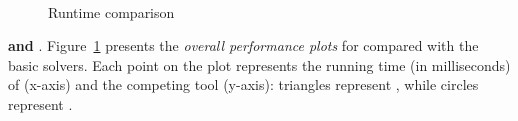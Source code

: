\begin{figure}
~
\caption{Runtime comparison}
\label{fig:toolplot}
\end{figure}

\textbf{\ringenSync{} and \theringenCICI{} }. Figure~\ref{fig:toolplot} presents the \textit{overall performance plots} for \theringenCICI{}compared with the basic solvers. Each point on the plot represents the running time (in milliseconds) of \theringenCICI{} (x-axis) and the competing tool (y-axis): triangles represent \theringen{}, while circles represent \racer{}.

